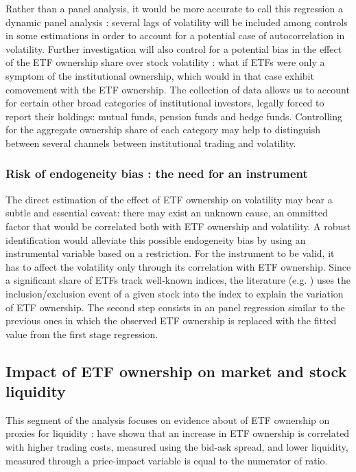 Rather than a panel analysis, it would be more accurate to call this regression a dynamic panel analysis : several lags of volatility will be included among controls in some estimations in order to account for a potential case of autocorrelation in volatility. Further investigation will also control for a potential bias in the effect of the ETF ownership share over stock volatility : what if ETFs were only a symptom of the institutional ownership, which would in that case exhibit comovement with the ETF ownership. The collection of data allows us to account for certain other broad categories of institutional investors, legally forced to report their holdings: mutual funds, pension funds and hedge funds. Controlling for the aggregate ownership share of each category may help to distinguish between several channels between institutional trading and volatility.
\subsubsection{Risk of endogeneity bias : the need for an instrument}
The direct estimation of the effect of ETF ownership on volatility may bear a subtle and essential caveat: there may exist an unknown cause, an ommitted factor that would be correlated both with ETF ownership and volatility. A robust identification would alleviate this possible endogeneity bias by using an instrumental variable based on a restriction. For the instrument to be valid, it has to affect the volatility only through its correlation with ETF ownership. Since a significant share of ETFs track well-known indices, the literature (e.g. \textcite{Ben-David2018}) uses the inclusion/exclusion event of a given stock into the index to explain the variation of ETF ownership. The second step consists in an panel regression similar to the previous ones in which the observed ETF ownership is replaced with the fitted value from the first stage regression.
\subsection{Impact of ETF ownership on market and stock liquidity}
\label{subsec:Method:Liquidity}
This segment of the analysis focuses on evidence about of ETF ownership on proxies for liquidity : \textcite{Israeli2017} have shown that an increase in ETF ownership is correlated with higher trading costs, measured using the bid-ask spread, and lower liquidity, measured through a price-impact variable is equal to the numerator of \textcite{Amihud2002} ratio.

